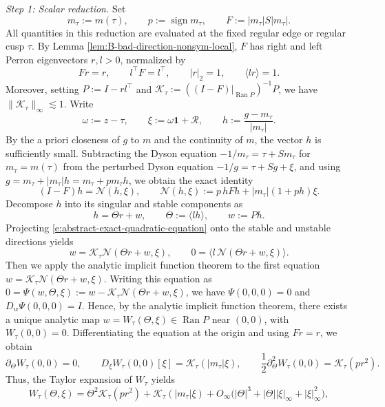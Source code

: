 \documentclass[11pt,twoside, a4paper]{article}
\numberwithin{equation}{section}
\numberwithin{figure}{section}
\theoremstyle{plain} %
\theoremstyle{definition}
\theoremstyle{remark}
\newcommand{\1} {\mspace{1 mu}}
\newcommand{\2} {\mspace{2 mu}}
\DeclareMathOperator{\Ran}{Ran}
\begin{document}
\medskip
\noindent
\emph{Step 1: Scalar reduction.}
Set
\[
m_\tau:=m(\tau),
\qquad
p:=\operatorname{sign}m_\tau,
\qquad
F:=|m_\tau|S|m_\tau|.
\]
All quantities in this reduction are evaluated at the fixed regular edge or regular cusp $\tau$. By
Lemma \ref{lem:B-bad-direction-nonsym-local},
$F$ has right and left Perron eigenvectors $r,l>0$, normalized by
\[
Fr=r,
\qquad
l^\top F=l^\top,
\qquad
|r|_2=1,
\qquad
\langle lr\rangle=1.
\]
Moreover, setting
$
P:=I-rl^\top
$
and
$
\mathcal K_\tau:=((I-F)|_{\Ran P})^{-1}P$,
we have $\|\mathcal K_\tau\|_{\infty}\lesssim1$.
Write
\[
\omega:=z-\tau,
\qquad
\xi:=\omega\mathbf1+\mathcal{R},
\qquad
h:=\frac{g-m_\tau}{|m_\tau|}.
\]
By the a priori closeness of $g$ to $m$ and the continuity
of $m$, the vector $h$ is sufficiently small.
Subtracting the Dyson equation $-1/m_\tau=\tau+S m_\tau$ for $m_\tau=m(\tau)$ from the perturbed Dyson equation $-1/g=\tau+Sg+\xi$, and using $g=m_\tau+|m_\tau|h=m_\tau+p m_\tau h$, we obtain the exact identity
\begin{equation}
\label{e:abstract-exact-quadratic-equation}
(I-F)h=\mathcal N(h,\xi),
\qquad
\mathcal N(h,\xi):=p\,hFh+|m_\tau|(1+ph)\xi.
\end{equation}
Decompose $h$ into its singular and stable components as
\[
h=\Theta r+w,
\qquad
\Theta:=\langle lh\rangle,
\qquad
w:=Ph.
\]
Projecting \eqref{e:abstract-exact-quadratic-equation} onto the
stable and unstable directions yields
\begin{equation}
\label{e:abstract-projected-equations}
w=\mathcal K_\tau\mathcal N(\Theta r+w,\xi),
\qquad
0=\langle l\,\mathcal N(\Theta r+w,\xi)\rangle.
\end{equation}
Then we apply the analytic implicit function theorem to the first
equation $w=\mathcal K_\tau\mathcal N(\Theta r+w,\xi)$. 
Writing this equation as \(0=\Psi(w,\Theta,\xi):=w-\mathcal K_\tau\mathcal N(\Theta r+w,\xi)\), we have \(\Psi(0,0,0)=0\) and \(D_w\Psi(0,0,0)=I\). Hence, by the analytic implicit function theorem, there exists a unique analytic map \(w=W_\tau(\Theta,\xi)\in\operatorname{Ran}P\) near \((0,0)\), with \(W_\tau(0,0)=0\).
Differentiating the equation at the origin and using \(Fr=r\), we obtain
\[
\partial_\Theta W_\tau(0,0)=0,\qquad
D_\xi W_\tau(0,0)[\xi]=\mathcal K_\tau(|m_\tau|\xi),\qquad \frac12\partial_\Theta^2W_\tau(0,0)
=\mathcal K_\tau(pr^2).
\]
Thus, the Taylor expansion of \(W_\tau\) yields
\begin{equation}\label{eq.expansion-Wtau}
  W_\tau(\Theta,\xi)
=
\Theta^2\mathcal K_\tau(pr^2)+\mathcal K_\tau(|m_\tau|\xi)
+
O_\infty\bigl(
|\Theta|^3+|\Theta||\xi|_\infty+|\xi|_\infty^2
\bigr),
\end{equation}
\end{document}
